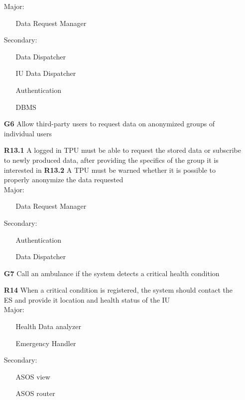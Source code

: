 \begin{itemize}
Major:
\begin{itemize}
\item[\textbullet]Data Request Manager 
\end{itemize}
Secondary:
\begin{itemize}
\item[\textbullet]Data Dispatcher
\item[\textbullet]IU Data Dispatcher
\item[\textbullet]Authentication
\item[\textbullet]DBMS
\end{itemize}

\item [\textbf{G6}] Allow third-party users to request data on anonymized groups of individual users

\subitem \textbf{R13.1} A logged in TPU must be able to request the stored data or subscribe to newly produced data, after providing the specifics of the group it is interested in
\subitem \textbf{R13.2} A TPU must be warned whether it is possible to properly anonymize the data requested\\

Major:
\begin{itemize}
\item[\textbullet]Data Request Manager 
\end{itemize}
Secondary:
\begin{itemize}
\item[\textbullet]Authentication
\item[\textbullet]Data Dispatcher
\end{itemize}

\item [\textbf{G7}] Call an ambulance if the system detects a critical health condition

\subitem \textbf{R14} When a critical condition is registered, the system should contact the ES and provide it location and health status of the IU\\

Major:
\begin{itemize}
\item[\textbullet] Health Data analyzer
\item[\textbullet] Emergency Handler
\end{itemize}
Secondary:
\begin{itemize}
\item[\textbullet]ASOS view
\item[\textbullet]ASOS router
\end{itemize}


\end{itemize}
